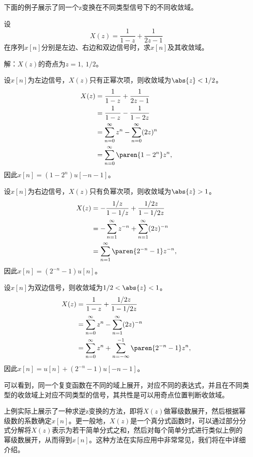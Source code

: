 下面的例子展示了同一个z变换在不同类型信号下的不同收敛域。
\begin{example}[收敛域的确定]\label{exmp:ROC}
    设
    \begin{equation}
        X(z)=\frac{1}{1-z}+\frac{1}{2z-1}
    \end{equation}
    在序列$x[n]$分别是左边、右边和双边信号时，求$x[n]$及其收敛域。

    解：$X(z)$的奇点为$z=1,\ 1/2$。

     设$x[n]$为左边信号，$X(z)$只有正幂次项，则收敛域为$\abs{z}<1/2$。
    \begin{align}
        X(z) & =\frac{1}{1-z}+\frac{1}{2z-1}\nonumber                         \\
             & =\frac{1}{1-z}-\frac{1}{1-2z}\nonumber                         \\
             & =\sum_{n=0}^{\infty}z^{n}-\sum_{n=0}^{\infty}(2z)^{n}\nonumber \\
             & =\sum_{n=0}^{\infty}\paren{1-2^{n}}z^{n},
    \end{align}
    因此$x[n]=(1-2^{n})u[-n-1]$。

     设$x[n]$为右边信号，$X(z)$只有负幂次项，则收敛域为$\abs{z}>1$。
    \begin{align}
        X(z) & =-\frac{1/z}{1-1/z}+\frac{1/2z}{1-1/2z}\nonumber                  \\
             & =-\sum_{n=1}^{\infty}z^{-n}+\sum_{n=1}^{\infty}(2z)^{-n}\nonumber \\
             & =\sum_{n=1}^{\infty}\paren{2^{-n}-1}z^{-n},
    \end{align}
    因此$x[n]=(2^{-n}-1)u[n]$。

     设$x[n]$为双边信号，则收敛域为$1/2<\abs{z}<1$。
    \begin{align}
        X(z) & =\frac{1}{1-z}+\frac{1/2z}{1-1/2z}\nonumber                           \\
             & =\sum_{n=0}^{\infty}z^{n}-\sum_{n=1}^{\infty}(2z)^{-n}\nonumber       \\
             & =\sum_{n=0}^{\infty}z^{n}+\sum_{n=-\infty}^{-1}\paren{2^{-n}-1}z^{n},
    \end{align}
    因此$x[n]=u[n]+(2^{-n}-1)u[-n-1]$。
\end{example}
可以看到，同一个复变函数在不同的域上展开，对应不同的表达式，并且在不同类型的收敛域上对应不同类型的信号，其共性是可以用奇点位置判断收敛域。

上例实际上展示了一种求逆z变换的方法，即将$X(z)$做幂级数展开，然后根据幂级数的系数确定$x[n]$。更一般地，$X(z)$是一个真分式函数时，可以通过部分分式分解将$X(z)$表示为若干简单分式之和，然后对每个简单分式进行类似上例的幂级数展开，从而得到$x[n]$。这种方法在实际应用中非常常见，我们将在中详细介绍。

